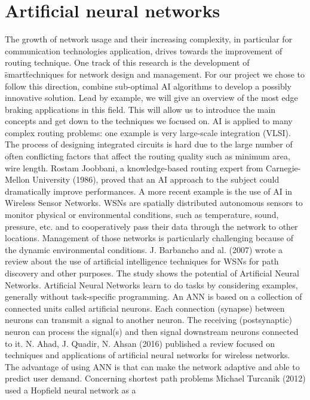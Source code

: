\section{Artificial neural networks}
\bigbreak
The growth of network usage and their increasing complexity, in particular for communication 
technologies application, drives towards the improvement of routing technique. One track of this 
research is the development of \"smart\" techniques for network design and management.
\bigbreak
For our project we chose to follow this direction, combine sub-optimal AI algorithms to develop a 
possibly innovative solution. Lead by example, we will give an overview of the most edge braking 
applications in this field. This will allow us to introduce the main concepts and get down to the 
techniques we focused on.
\bigbreak
AI is applied to many complex routing problems: one example is very large-scale integration (VLSI). 
 The process of designing integrated circuits is hard due to the large number of often conflicting 
 factors that affect the routing quality such as minimum area, wire length. Rostam Joobbani, a 
 knowledge-based routing expert from Carnegie-Mellon University (1986), proved that an AI approach 
 to the subject could dramatically improve performances. 
\bigbreak
A more recent example is the use of AI in Wireless Sensor Networks. WSNs are spatially distributed 
autonomous sensors to monitor physical or environmental conditions, such as temperature, sound, 
pressure, etc. and to cooperatively pass their data through the network to other locations. Management
 of those networks is particularly challenging because of the dynamic environmental conditions. 
J. Barbancho and al. (2007) wrote a review about the use of artificial intelligence techniques for 
WSNs for path discovery and other purposes. The study shows the potential of Artificial Neural Networks. 
\bigbreak
Artificial Neural Networks learn to do tasks by considering examples, generally without task-specific 
programming. An ANN is based on a collection of connected units called artificial neurons. Each 
connection (synapse) between neurons can transmit a signal to another neuron. The receiving 
(postsynaptic) neuron can process the signal(s) and then signal downstream neurons connected to it.
\bigbreak
N. Ahad, J.  Quadir, N. Ahsan (2016) published a review focused on techniques and applications of 
artificial neural networks for wireless networks. The advantage of using ANN is that can make the 
network adaptive and able to predict user demand.
\bigbreak
Concerning shortest path problems Michael Turcanik (2012) used a Hopfield neural network as a 
